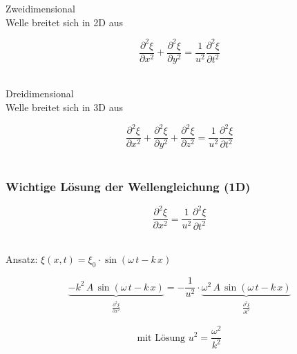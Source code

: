 \begin{minipage}{0.45\linewidth}
Zweidimensional \\
Welle breitet sich in 2D aus \\
\end{minipage}
\hfill
\begin{minipage}{0.48\linewidth}
$$\boxed{ \frac{\partial^2 \xi}{\partial x^2} + \frac{\partial^2 \xi}{\partial y^2} = \frac{1}{u^2} \frac{\partial^2 \xi}{\partial t^2}  }$$  \\
\end{minipage}




\begin{minipage}{0.45\linewidth}
Dreidimensional \\
Welle breitet sich in 3D aus \\
\end{minipage}
\hfill
\begin{minipage}{0.48\linewidth}
$$\boxed{ \frac{\partial^2 \xi}{\partial x^2} + \frac{\partial^2 \xi}{\partial y^2} + \frac{\partial^2 \xi}{\partial z^2} = \frac{1}{u^2} \frac{\partial^2 \xi}{\partial t^2}  }$$ \\
\end{minipage}



\subsubsection{Wichtige Lösung der Wellengleichung (1D)}

\begin{minipage}{0.38\linewidth}
$$\frac{\partial^2 \xi}{\partial x^2} = \frac{1}{u^2} \frac{\partial^2 \xi}{\partial t^2} $$ \\
\end{minipage}
\hfill
\begin{minipage}{0.58\linewidth}
Ansatz: $\xi(x,t) = \xi_0 \cdot \sin(\omega \, t - k \, x)$ \\
\end{minipage}

$$ \underbrace{- k^2 \, A \, \sin(\omega \, t - k \, x)}_{\substack{\frac{\partial^2 \xi}{\partial x^2} }} = - \frac{1}{u^2} \cdot \underbrace{ \omega^2 \, A \,\sin(\omega \, t - k \, x)}_{\substack{\frac{\partial^2 \xi}{\partial t^2} }}  $$ 


$$ \boxed{ \text{mit Lösung } u^2 = \frac{\omega^2}{k^2} } $$



